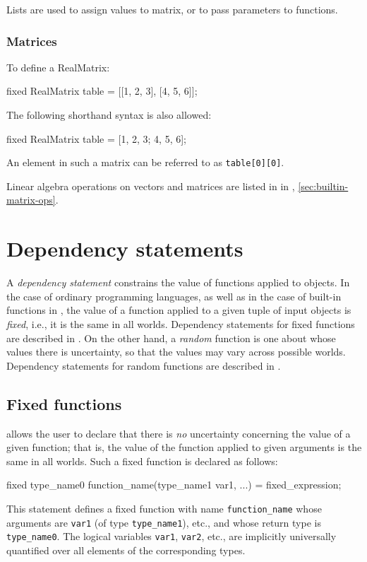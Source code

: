 \documentclass[12pt]{article}
\begin{document}
Lists are used to assign values to matrix, or to pass parameters to functions.

\subsubsection{Matrices}\label{matrix-section}
To define a RealMatrix:
\begin{blogcode}
fixed RealMatrix table = [[1, 2, 3], [4, 5, 6]];
\end{blogcode}
The following shorthand syntax is also allowed:
\begin{blogcode}
fixed RealMatrix table = [1, 2, 3; 4, 5, 6];
\end{blogcode}
An element in such a matrix can be referred to as \texttt{table[0][0]}.

Linear algebra operations on vectors and matrices are listed in
in , \ref{sec:builtin-matrix-ops}.


\section{Dependency statements}\label{dependency-section}

A {\em dependency statement} constrains the value of functions applied to objects. In the case of ordinary programming languages,
as well as in the case of built-in functions in \bl, the value of a function applied to a given tuple of input objects is {\em fixed},
i.e., it is the same in all worlds. Dependency statements for fixed functions are described in . On the other hand, a {\em random} function
is one about whose values there is uncertainty, so that the values may vary across possible worlds. Dependency statements for random functions are described in .

\subsection{Fixed functions}\label{fixed-section}

\bl allows the user to declare that there is {\em no} uncertainty concerning the value of a given function; that is, the
value of the function applied to given arguments is the same in all worlds. Such a fixed function is declared as follows:
\begin{blogcode}
fixed type_name0 function_name(type_name1 var1, ...) = 
  fixed_expression;
\end{blogcode}
This statement defines a fixed function with name \texttt{function\_name} whose arguments are {\tt var1} (of type \verb|type_name1|), etc.,
and whose return type is \verb|type_name0|. The logical variables {\tt var1}, {\tt var2}, etc., are implicitly universally quantified over
all elements of the corresponding types.
\end{document}
